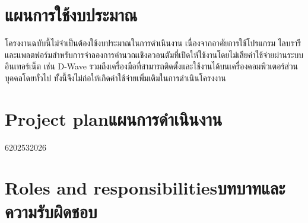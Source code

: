 \newif\ifBudget
\Budgetfalse %

\section{\ifBudget Allocation Plan\else แผนการใช้งบประมาณ\fi}
โครงงานฉบับนี้ไม่จำเป็นต้องใช้งบประมาณในการดำเนินงาน เนื่องจากอาศัยการใช้โปรแกรม ไลบรารี และแพลตฟอร์มสำหรับการจำลองการคำนวณเชิงควอนตัมที่เปิดให้ใช้งานโดยไม่เสียค่าใช้จ่ายผ่านระบบอินเทอร์เน็ต เช่น D-Wave รวมถึงเครื่องมือที่สามารถติดตั้งและใช้งานได้บนเครื่องคอมพิวเตอร์ส่วนบุคคลโดยทั่วไป ทั้งนี้จึงไม่ก่อให้เกิดค่าใช้จ่ายเพิ่มเติมในการดำเนินโครงงาน


\newpage
\section{\ifenglish Project plan\else แผนการดำเนินงาน\fi}
\begin{plan}{6}{2025}{3}{2026}
\end{plan}

\section{\ifenglish Roles and responsibilities\else บทบาทและความรับผิดชอบ\fi}

